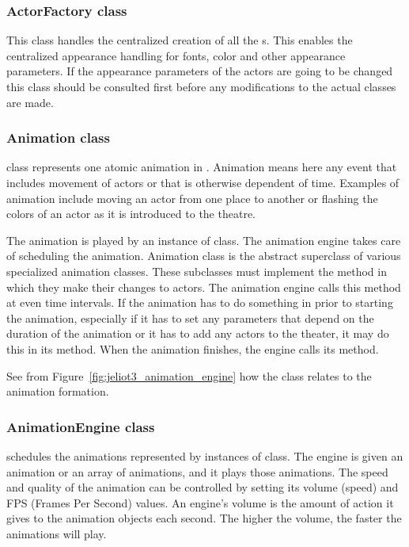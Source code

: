 \subsubsection{ActorFactory class}

This class handles the centralized creation of all the s. This enables the centralized appearance handling for fonts, color and other appearance parameters. If the appearance parameters of the actors are going to be changed this class should be consulted first before any modifications to the actual  classes are made.

\subsubsection{Animation class}

 class represents one atomic animation in . Animation means here any event that includes movement of actors or that is otherwise dependent of time. Examples of animation include moving an actor from one place to another or flashing the colors of an actor as it is introduced to the theatre.

The animation is played by an instance of  class. The animation engine takes care of scheduling the animation. Animation class is the abstract superclass of various specialized animation classes. These subclasses must implement the  method in which they make their changes to actors. The animation engine calls this method at even time intervals. If the animation has to do something in prior to starting the animation, especially if it has to set any parameters that depend on the duration of the animation or it has to add any actors to the theater, it may do this in its  method. When the animation finishes, the engine calls its  method.

See from Figure~\ref{fig:jeliot3_animation_engine} how the  class relates to the animation formation.

\subsubsection{AnimationEngine class}

 schedules the animations represented by instances of  class. The engine is given an animation or an array of animations, and it plays those animations. The speed and quality of the animation can be controlled by setting its volume (speed) and FPS (Frames Per Second) values. An engine's volume is the amount of action it gives to the animation objects each second. The higher the volume, the faster the animations will play.

